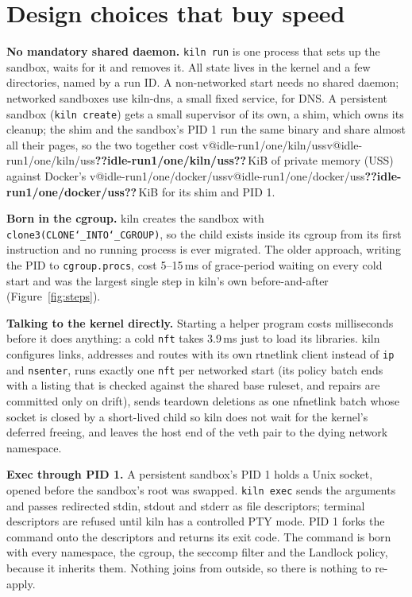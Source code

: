 \documentclass[10pt,letterpaper]{article}
\makeatletter
\newcommand{\code}[1]{\texttt{#1}}
\newcommand{\us}{\char`\_}
\newcommand{\V}[1]{\ifcsname v@#1\endcsname\csname v@#1\endcsname\else\textbf{??#1??}\fi}
\makeatother
\begin{document}
\section{Design choices that buy speed}

\textbf{No mandatory shared daemon.} \code{kiln run} is one process that sets
up the sandbox, waits for it and removes it. All state lives in the kernel and a
few directories, named by a run ID. A non-networked start needs no shared
daemon; networked sandboxes use kiln-dns, a small fixed service, for DNS. A
persistent sandbox (\code{kiln create}) gets a
small supervisor of its own, a shim, which owns its cleanup; the shim and the
sandbox's PID 1 run the same binary and share almost all their pages, so the
two together cost \V{idle-run1/one/kiln/uss}\,KiB of private memory
(USS) against Docker's \V{idle-run1/one/docker/uss}\,KiB for its shim and PID 1.

\textbf{Born in the cgroup.} kiln creates the sandbox with
\code{clone3(CLONE\us{}INTO\us{}CGROUP)}, so the child exists inside its cgroup from
its first instruction and no running process is ever migrated. The older
approach, writing the PID to \code{cgroup.procs}, cost 5--15\,ms of grace-period
waiting on every cold start and was the largest single step in kiln's own
before-and-after (Figure~\ref{fig:steps}).

\textbf{Talking to the kernel directly.} Starting a helper program costs
milliseconds before it does anything: a cold \code{nft} takes 3.9\,ms just to
load its libraries. kiln configures links, addresses and routes with its own
rtnetlink client instead of \code{ip} and \code{nsenter}, runs exactly one
\code{nft} per networked start (its policy batch ends with a listing that is
checked against the shared base ruleset, and repairs are committed only on
drift), sends teardown deletions as one nfnetlink batch whose socket is closed
by a short-lived child so kiln does not wait for the kernel's deferred
freeing, and leaves the host end of the veth pair to the dying network
namespace.

\textbf{Exec through PID 1.} A persistent sandbox's PID 1 holds a Unix socket,
opened before the sandbox's root was swapped. \code{kiln exec} sends the
arguments and passes redirected stdin, stdout and stderr as file descriptors;
terminal descriptors are refused until kiln has a controlled PTY mode. PID 1
forks the command onto the descriptors and returns its exit code. The command is born with
every namespace, the cgroup, the seccomp filter and the Landlock policy, because
it inherits them. Nothing joins from outside, so there is nothing to re-apply.
\end{document}
